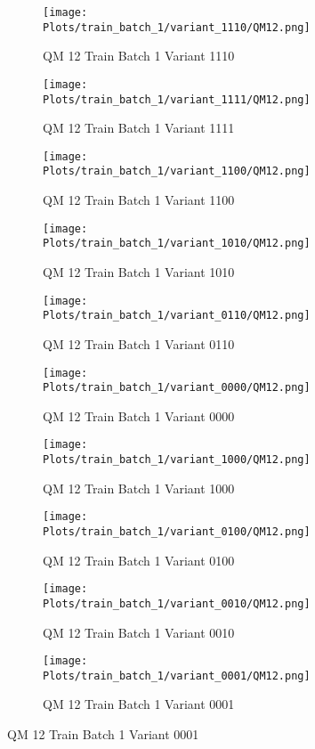 \documentclass{DissertateFigs}
\begin{document}
\begin{figure}[t!]
    \begin{subfigure}{0.47\textwidth}
    \texttt{[image: Plots/train\_batch\_1/variant\_1110/QM12.png]}
    \caption{QM 12 Train Batch 1 Variant 1110}
    \end{subfigure}
    \begin{subfigure}{0.47\textwidth}
    \texttt{[image: Plots/train\_batch\_1/variant\_1111/QM12.png]}
    \caption{QM 12 Train Batch 1 Variant 1111}
    \end{subfigure}

\medskip

    \begin{subfigure}{0.47\textwidth}
    \texttt{[image: Plots/train\_batch\_1/variant\_1100/QM12.png]}
    \caption{QM 12 Train Batch 1 Variant 1100}
    \end{subfigure}
    \begin{subfigure}{0.47\textwidth}
    \texttt{[image: Plots/train\_batch\_1/variant\_1010/QM12.png]}
    \caption{QM 12 Train Batch 1 Variant 1010}
    \end{subfigure}

\medskip

    \begin{subfigure}{0.47\textwidth}
    \texttt{[image: Plots/train\_batch\_1/variant\_0110/QM12.png]}
    \caption{QM 12 Train Batch 1 Variant 0110}
    \end{subfigure}
    \begin{subfigure}{0.47\textwidth}
    \texttt{[image: Plots/train\_batch\_1/variant\_0000/QM12.png]}
    \caption{QM 12 Train Batch 1 Variant 0000}
    \end{subfigure}

\medskip

    \begin{subfigure}{0.47\textwidth}
    \texttt{[image: Plots/train\_batch\_1/variant\_1000/QM12.png]}
    \caption{QM 12 Train Batch 1 Variant 1000}
    \end{subfigure}
    \begin{subfigure}{0.47\textwidth}
    \texttt{[image: Plots/train\_batch\_1/variant\_0100/QM12.png]}
    \caption{QM 12 Train Batch 1 Variant 0100}
    \end{subfigure}

\medskip

    \begin{subfigure}{0.47\textwidth}
    \texttt{[image: Plots/train\_batch\_1/variant\_0010/QM12.png]}
    \caption{QM 12 Train Batch 1 Variant 0010}
    \end{subfigure}
    \begin{subfigure}{0.47\textwidth}
    \texttt{[image: Plots/train\_batch\_1/variant\_0001/QM12.png]}
    \caption{QM 12 Train Batch 1 Variant 0001}
    \end{subfigure}


\end{figure}
\end{document}
